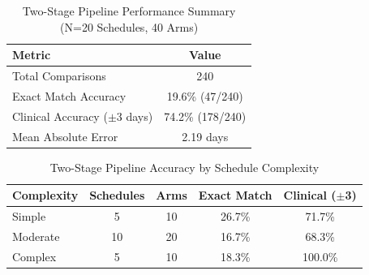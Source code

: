 

\begin{table}[htbp]
\centering
\caption{Two-Stage Pipeline Performance Summary (N=20 Schedules, 40 Arms)}
\label{tab:two_stage_summary_20}
\begin{tabular}{lc}
\toprule
\textbf{Metric} & \textbf{Value} \\
\midrule
Total Comparisons & 240 \\
Exact Match Accuracy & 19.6\% (47/240) \\
Clinical Accuracy ($\pm$3 days) & 74.2\% (178/240) \\
Mean Absolute Error & 2.19 days \\
\bottomrule
\end{tabular}
\end{table}


\begin{table}[htbp]
\centering
\caption{Two-Stage Pipeline Accuracy by Schedule Complexity}
\label{tab:two_stage_complexity_20}
\begin{tabular}{lcccc}
\toprule
\textbf{Complexity} & \textbf{Schedules} & \textbf{Arms} & \textbf{Exact Match} & \textbf{Clinical ($\pm$3)} \\
\midrule
Simple & 5 & 10 & 26.7\% & 71.7\% \\
Moderate & 10 & 20 & 16.7\% & 68.3\% \\
Complex & 5 & 10 & 18.3\% & 100.0\% \\
\bottomrule
\end{tabular}
\end{table}


